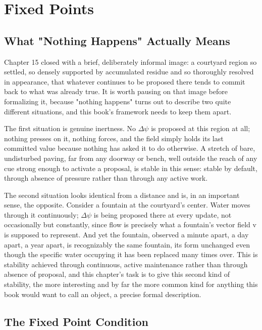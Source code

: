 \chapter{Fixed Points}

\section{What "Nothing Happens" Actually Means}

Chapter 15 closed with a brief, deliberately informal image: a courtyard region so settled, so densely supported by accumulated residue and so thoroughly resolved in appearance, that whatever continues to be proposed there tends to commit back to what was already true. It is worth pausing on that image before formalizing it, because "nothing happens" turns out to describe two quite different situations, and this book's framework needs to keep them apart.

The first situation is genuine inertness. No \(\Delta\psi\) is proposed at this region at all; nothing presses on it, nothing forces, and the field simply holds its last committed value because nothing has asked it to do otherwise. A stretch of bare, undisturbed paving, far from any doorway or bench, well outside the reach of any cue strong enough to activate a proposal, is stable in this sense: stable by default, through absence of pressure rather than through any active work.

The second situation looks identical from a distance and is, in an important sense, the opposite. Consider a fountain at the courtyard's center. Water moves through it continuously; \(\Delta\psi\) is being proposed there at every update, not occasionally but constantly, since flow is precisely what a fountain's vector field v is supposed to represent. And yet the fountain, observed a minute apart, a day apart, a year apart, is recognizably the same fountain, its form unchanged even though the specific water occupying it has been replaced many times over. This is stability achieved through continuous, active maintenance rather than through absence of proposal, and this chapter's task is to give this second kind of stability, the more interesting and by far the more common kind for anything this book would want to call an object, a precise formal description.

\section{The Fixed Point Condition}

